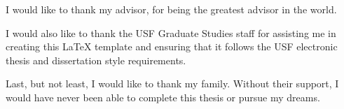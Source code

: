 I would like to thank my advisor, for being the greatest advisor in the world.

I would also like to thank the USF Graduate Studies staff for assisting me in creating this LaTeX template and ensuring that it follows the USF electronic thesis and dissertation style requirements.

Last, but not least, I would like to thank my family. Without their support, I would have never been able to complete this thesis or pursue my dreams.